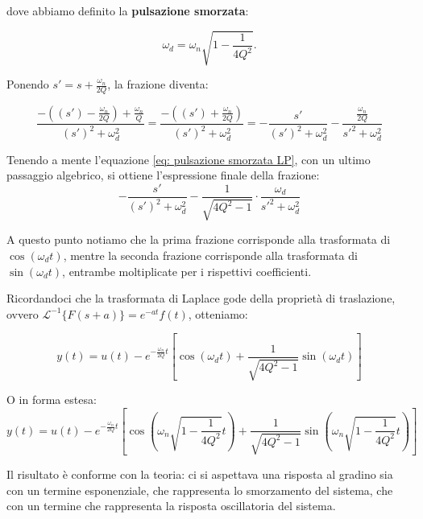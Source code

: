 dove abbiamo definito la \textbf{pulsazione smorzata}:

\begin{equation}
    \omega_d = \omega_n \sqrt{1 - \frac{1}{4Q^2}}.
    \label{eq: pulsazione smorzata LP}
\end{equation}

Ponendo $s' = s + \frac{\omega_n}{2Q}$, la frazione diventa:

\begin{equation}
    \frac{-\left(\left(s'\right) - \frac{\omega_n}{2Q}\right) + \frac{\omega_n}{Q}}{\left(s'\right)^2 + \omega_d^2} = \frac{-\left(\left(s'\right) + \frac{\omega_n}{2Q}\right)}{\left(s'\right)^2 + \omega_d^2} = - \frac{s'}{\left(s'\right)^2 + \omega_d^2} - \frac{\frac{\omega_n}{2Q}}{s'^2 + \omega_d^2}
    \label{eq: quasi L sin e cos LP}
\end{equation}

Tenendo a mente l'equazione \ref{eq: pulsazione smorzata LP}, con un ultimo passaggio algebrico, si ottiene l'espressione finale della frazione:
\begin{equation}
- \frac{s'}{\left(s'\right)^2 + \omega_d^2} - \frac{1}{\sqrt{4Q^2-1}} \cdot \frac{\omega_d}{s'^2 + \omega_d^2}
\label{eq: L sin e cos LP}
\end{equation}


A questo punto notiamo che la prima frazione corrisponde alla trasformata di $\cos(\omega_d t)$, mentre la seconda frazione corrisponde alla trasformata di $\sin(\omega_d t)$, entrambe moltiplicate per i rispettivi coefficienti.  

Ricordandoci che la trasformata di Laplace gode della proprietà di traslazione, ovvero $\mathcal{L}^{-1}\{F(s + a)\} = e^{-at} f(t)$, otteniamo:

\begin{equation}
    y(t) = u(t) - e^{-\frac{\omega_n}{2Q} t} \left[\cos(\omega_d t) + \frac{1}{\sqrt{4Q^2-1}} \sin(\omega_d t)\right]
    \label{eq: y_t con pulsazione smorzata LP}
\end{equation}

O in forma estesa:
\begin{equation}
    y(t) = u(t) - e^{-\frac{\omega_n}{2Q} t} \left[\cos\left(\omega_n \sqrt{1 - \frac{1}{4Q^2}} t\right) + \frac{1}{\sqrt{4Q^2-1}} \sin\left(\omega_n \sqrt{1 - \frac{1}{4Q^2}} t\right)\right]
    \label{eq: y_t completa LP}
\end{equation}

Il risultato è conforme con la teoria: ci si aspettava una risposta al gradino sia con un termine esponenziale, che rappresenta lo smorzamento del sistema, che con un termine che rappresenta la risposta oscillatoria del sistema. 


